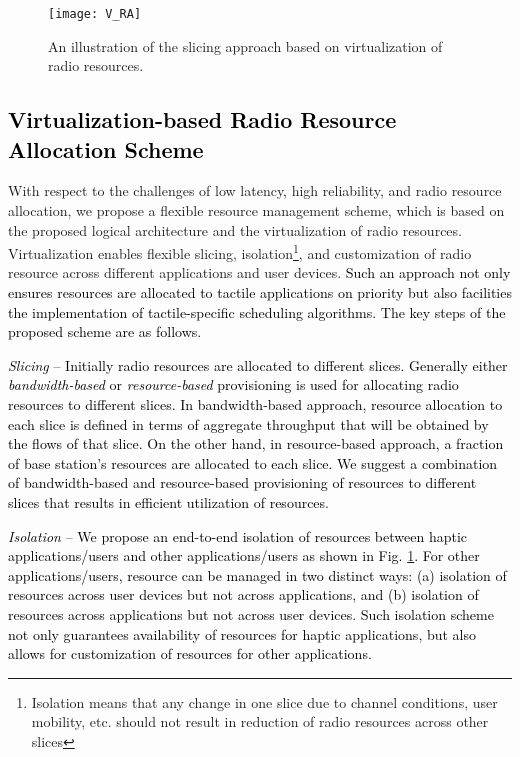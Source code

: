 \documentclass[journal]{IEEEtran}
\begin{document}
\begin{figure}
\centering
\texttt{[image: V\_RA]}
\caption{An illustration of the slicing approach based on virtualization of radio resources.}
\label{vra}
\end{figure}







\subsection{\textcolor{black}{Virtualization-based Radio Resource Allocation Scheme}}
With respect to the challenges of low latency, high reliability, and radio resource allocation, we propose a flexible resource management scheme, which is based on the proposed logical architecture and the virtualization of radio resources. Virtualization enables flexible slicing, isolation\footnote{Isolation means that any change in one slice due to channel conditions, user mobility, etc. should not result in reduction of radio resources across other slices}, and customization of radio resource across different applications and user devices. \textcolor{black}{Such an approach not only ensures resources are allocated to tactile applications on priority but also facilities the implementation of tactile-specific scheduling algorithms. The key steps of the proposed scheme are as follows.}

\textcolor{black}{\emph{Slicing} -- Initially radio resources are allocated to different slices. Generally either \emph{bandwidth-based} or \emph{resource-based} provisioning is used for allocating radio resources to different slices. In bandwidth-based approach, resource allocation to each slice is defined in terms of aggregate throughput that will be obtained by the flows of that slice. On the other hand, in resource-based approach, a fraction of base station's resources are allocated to each slice. We suggest a combination of bandwidth-based and resource-based provisioning of resources to different slices that results in efficient utilization of resources.}

\textcolor{black}{\emph{Isolation} -- We propose an end-to-end isolation of resources between haptic applications/users and other applications/users as shown in Fig. \ref{vra}. For other applications/users, resource can be managed in two distinct ways: (a) isolation of resources across user devices but not across applications, and  (b) isolation of resources across applications but not across user devices. Such isolation scheme not only guarantees availability of resources for haptic applications, but also allows for customization of resources for other applications.  }
\end{document}
